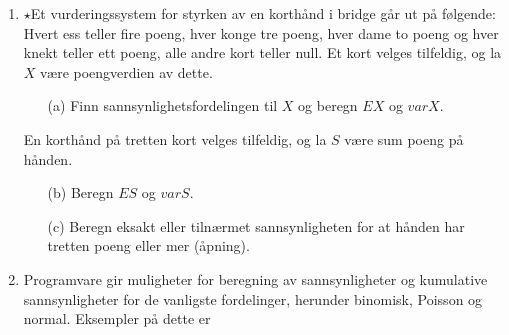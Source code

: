 \begin{enumerate}
\item $\star$Et vurderingssystem for styrken av en korthånd i bridge
     går ut på følgende: Hvert ess teller fire poeng, hver konge tre
     poeng, hver dame to poeng og hver knekt teller ett poeng,
     alle andre kort teller null. Et kort velges tilfeldig, og la
     $X$ være poengverdien av dette.
     \begin{itemize}
     \item[(a)]  Finn sannsynlighetsfordelingen til $X$ og beregn $EX$
          og $varX$.
     \end{itemize}
     En korthånd på tretten kort velges tilfeldig, og la $S$ være
     sum poeng på hånden.
     \begin{itemize}
     \item[(b)]  Beregn $ES$ og $varS$.
     \item[(c)]  Beregn eksakt eller tilnærmet sannsynligheten for at
          hånden har tretten poeng eller mer (åpning).
     \end{itemize}

\item Programvare gir muligheter for beregning av sannsynligheter og
      kumulative sannsynligheter for de vanligste fordelinger, herunder
      binomisk, Poisson og normal. Eksempler på dette er
     
\begin{center} 
\end{center}
\end{enumerate}
